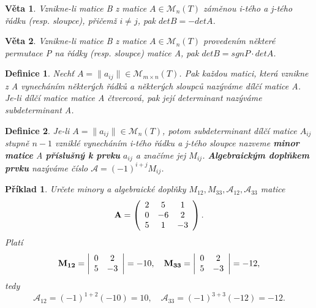 \documentclass[12pt,a4paper]{article}
\newtheorem{definition}{Definice}
\newtheorem{sentence}{Věta}
\newtheorem{example}{Příklad}
\begin{document}
\begin{sentence}
	Vznikne-li matice B z matice $A \in \mathscr{M}_n(T)$ záměnou i-tého a j-tého řádku (resp. sloupce), přičemž $i \not= j$, pak $detB = - detA$.
\end{sentence}

\begin{sentence}
	Vznikne-li matice B z matice $A \in \mathscr{M}_n(T)$ provedením některé permutace P na řádky (resp. sloupce) matice A, pak $detB = sgnP \cdot detA$.
\end{sentence}

\begin{definition}
	Nechť $A = \| a_{ij} \| \in \mathscr{M}_{m \times n}(T)$. Pak každou matici, která vznikne z A vynecháním některých řádků a některých sloupců nazýváme dílčí matice A. Je-li dílčí matice matice A čtvercová, pak její determinant nazýváme subdeterminant A.
\end{definition}

\begin{definition}
	Je-li  $A = \| a_{ij} \| \in \mathscr{M}_{n}(T)$, potom subdeterminant dílčí matice $A_{ij}$ stupně $n - 1$ vzniklé vynecháním i-tého řádku a j-tého sloupce nazveme \textbf{minor matice} A \textbf{příslušný k prvku} $a_{ij}$ a značíme jej $M_{ij}$. \textbf{Algebraickým doplňkem prvku} nazýváme číslo $\mathscr{A} = (-1)^{i+j} M_{ij}$.
\end{definition}

\begin{example}
	Určete minory a algebraické doplňky $M_{12}, M_{33}, \mathscr{A}_{12}, \mathscr{A}_{33}$ matice
	\begin{displaymath}
		{\bf A} =
		\left( \begin{array}{ccc}
			2 & 5 & 1  \\
			0 & -6 & 2  \\
			5 & 1 & -3  \\
		\end{array} \right).
	\end{displaymath}
Platí
	\begin{displaymath}
		{\bf M_{12}} =
		\left| \begin{array}{cc}
			0 & 2   \\
			5 & -3  \\
		\end{array} \right| = -10, \quad
		{\bf M_{33}} =
		\left| \begin{array}{cc}
			0 & 2   \\
			5 & -3  \\
		\end{array} \right| = -12, 
	\end{displaymath}
	tedy $$ \mathscr{A}_{12} = (-1)^{1+2}(-10) = 10,\quad \mathscr{A}_{33} = (-1)^{3+3}(-12) = -12.$$
\end{example}
\end{document}

